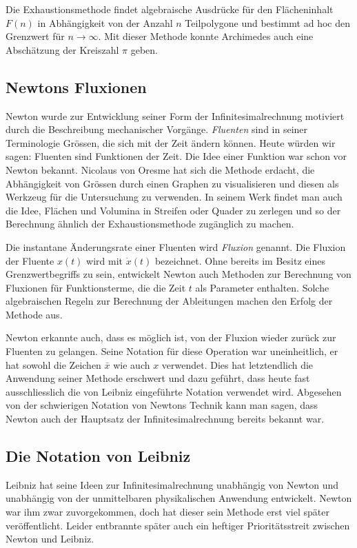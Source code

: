 Die Exhaustionsmethode findet algebraische Ausdrücke für den
Flächeninhalt $F(n)$ in Abhängigkeit von der Anzahl $n$ Teilpolygone
und bestimmt ad hoc den Grenzwert für $n\to\infty$.
Mit dieser Methode konnte Archimedes auch eine Abschätzung der
Kreiszahl $\pi$ geben.

%
%
\subsection{Newtons Fluxionen
\label{buch:einleitung:frueh:subsection:newton}}
Newton wurde zur Entwicklung seiner Form der Infinitesimalrechnung
motiviert durch die Beschreibung mechanischer Vorgänge.
\emph{Fluenten} sind in seiner Terminologie Grössen, die sich mit der
Zeit ändern können.
Heute würden wir sagen: Fluenten sind Funktionen der Zeit.
%
Die Idee einer Funktion war schon vor Newton bekannt.
%
Nicolaus von Oresme hat sich die Methode erdacht, die Abhängigkeit
%
von Grössen durch einen Graphen zu visualisieren und diesen als
Werkzeug für die Untersuchung zu verwenden.
In seinem Werk findet man auch die Idee, Flächen und Volumina in
Streifen oder Quader zu zerlegen und so der Berechnung ähnlich
der Exhaustionsmethode zugänglich zu machen.

Die instantane Änderungsrate einer Fluenten wird \emph{Fluxion} genannt.
%
Die Fluxion der Fluente $x(t)$ wird mit $\dot{x}(t)$ bezeichnet.
Ohne bereits im Besitz eines Grenzwertbegriffs zu sein, entwickelt
Newton auch Methoden zur Berechnung von Fluxionen für Funktionsterme, die
die Zeit $t$ als Parameter enthalten.
Solche algebraischen Regeln zur Berechnung der Ableitungen machen
den Erfolg der Methode aus.

Newton erkannte auch, dass es möglich ist, von der Fluxion wieder
zurück zur Fluenten zu gelangen.
Seine Notation für diese Operation war uneinheitlich, er hat sowohl
die Zeichen $\bar{x}$ wie auch $\boxed{x}$ verwendet.
Dies hat letztendlich die Anwendung seiner Methode erschwert und
dazu geführt, dass heute fast ausschliesslich die von Leibniz
eingeführte Notation verwendet wird.
Abgesehen von der schwierigen Notation von Newtons Technik kann man sagen,
dass Newton auch der Hauptsatz der Infinitesimalrechnung bereits bekannt war.

%
%
\subsection{Die Notation von Leibniz
\label{buch:einleitung:frueh:subsection:leibniz}}
Leibniz hat seine Ideen zur Infinitesimalrechnung unabhängig von Newton
%
und unabhängig von der unmittelbaren physikalischen Anwendung
entwickelt.
Newton war ihm zwar zuvorgekommen, doch hat dieser sein Methode erst
viel später veröffentlicht.
Leider entbrannte später auch ein heftiger Prioritätsstreit zwischen
Newton und Leibniz.
%

